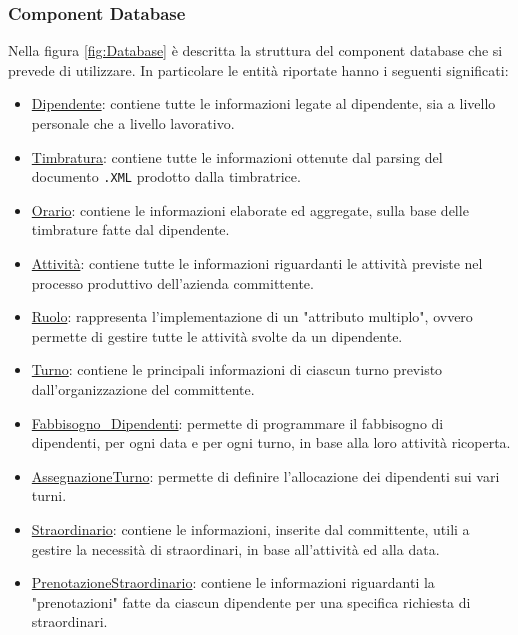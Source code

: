 \subsubsection{Component Database}
Nella figura \ref{fig:Database} è descritta la struttura del component database che si prevede di utilizzare. In particolare le entità riportate hanno i seguenti significati:
\begin{itemize}
	\item \underline{Dipendente}: contiene tutte le informazioni legate al dipendente, sia a livello personale che a livello lavorativo.
	\item \underline{Timbratura}: contiene tutte le informazioni ottenute dal parsing del documento \verb|.XML| prodotto dalla timbratrice.
	\item \underline{Orario}: contiene le informazioni elaborate ed aggregate, sulla base delle timbrature fatte dal dipendente.
	\item \underline{Attività}: contiene tutte le informazioni riguardanti le attività previste nel processo produttivo dell'azienda committente.
	\item \underline{Ruolo}: rappresenta l'implementazione di un "attributo multiplo", ovvero permette di gestire tutte le attività svolte da un dipendente.
	\item \underline{Turno}: contiene le principali informazioni di ciascun turno previsto dall'organizzazione del committente.
	\item \underline{Fabbisogno\_Dipendenti}: permette di programmare il fabbisogno di dipendenti, per ogni data e per ogni turno, in base alla loro attività ricoperta.
	\item \underline{AssegnazioneTurno}: permette di definire l'allocazione dei dipendenti sui vari turni.
	\item \underline{Straordinario}: contiene le informazioni, inserite dal committente, utili a gestire la necessità di straordinari, in base all'attività ed alla data.
	\item \underline{PrenotazioneStraordinario}: contiene le informazioni riguardanti la "prenotazioni" fatte da ciascun dipendente per una specifica richiesta di straordinari.
\end{itemize}
